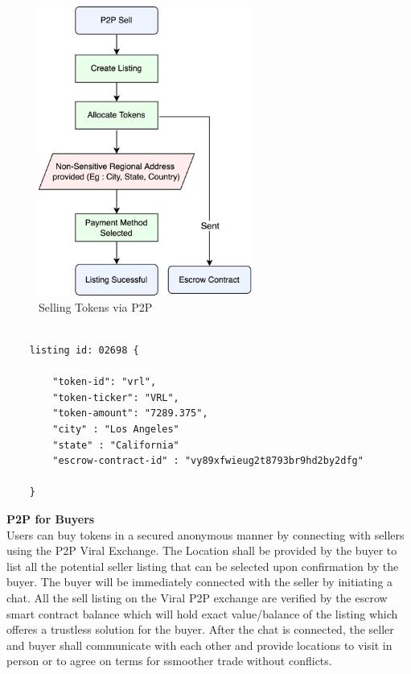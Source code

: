 \documentclass[10pt]{article}
\begin{document}
\begin{figure}[H]
\begin{center}
\includegraphics[width=7cm]{p2p-sell}
\caption{Selling Tokens via P2P}
\end{center}
\end{figure}

\begin{lstlisting}[caption={Token Sale Listing}, numbers=none]

	listing id: 02698 {
	
    	"token-id": "vrl",
   		"token-ticker": "VRL",
    	"token-amount": "7289.375",
    	"city" : "Los Angeles"
    	"state" : "California"
    	"escrow-contract-id" : "vy89xfwieug2t8793br9hd2by2dfg"
    	
	}
\end{lstlisting}


\textbf{P2P for Buyers}\\

Users can buy tokens in a secured anonymous manner by connecting with sellers using the P2P Viral Exchange. The Location shall be provided by the buyer to list all the potential seller listing that can be selected upon confirmation by the buyer. The buyer will be immediately connected with the seller by initiating a chat. All the sell listing on the Viral P2P exchange are verified by the escrow smart contract balance which will hold exact value/balance of the listing which offeres a trustless solution for the buyer. After the chat is connected, the seller and buyer shall communicate with each other and provide locations to visit in person or to agree on terms for ssmoother trade without conflicts.\\
\end{document}
